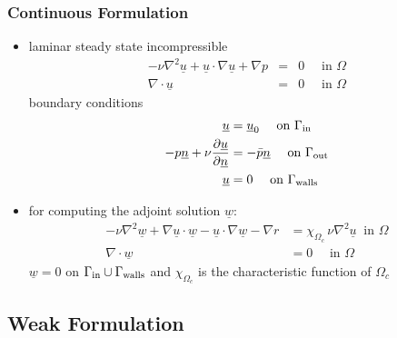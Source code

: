 \documentclass[10pt,t]{beamer}
\newcommand{\blue}[1]{{\color{blue}{#1}}}
\newcommand{\lblue}[1]{{\color{lblue}{#1}}}
\def \pder#1#2{\frac{\partial #1}{\partial #2}}
\newcommand{\ul}[1]{\underline{#1}}
\begin{document}
\begin{frame}
  \frametitle{Continuous Formulation}
  \begin{itemize}
  \item<1-> laminar steady state incompressible \blue{Navier-Stokes equations}
    \begin{eqnarray}
      -\nu \nabla^2 \ul{u} + \ul{u} \cdot \nabla \ul{u} + \nabla p & = & 0 \quad \mbox{ in }
      \Omega \label{eq-ns-1}\\
      \nabla \cdot \ul{u} & = & 0 \quad \mbox{ in } \Omega \label{eq-ns-2}
    \end{eqnarray}
    boundary conditions
    \begin{equation} \label{eq-ns-3}
      \begin{split}
        \ul{u} & = \ul{u}_0 \quad  \mbox{ on } \Gamma_{\rm in} \\
        -p \ul{n} + \nu \pder{\ul{u}}{\ul{n}} & = -\bar p \ul{n}
        \quad \mbox{ on } \Gamma_{\rm out} \\
        \ul{u} & = 0 \quad \mbox{ on } \Gamma_{\rm walls}
      \end{split}
    \end{equation}
  \item<2->
    \lblue{adjoint equations} for computing the adjoint solution $\ul{w}$:
    \begin{equation}\label{eq-ns-33}
      \begin{split}
        -\nu \nabla^2 \ul{w} + \nabla \ul{u} \cdot \ul{w} - \ul{u} \cdot \nabla
        \ul{w} - \nabla r & =
        \chi_{\Omega_c} \,\nu \nabla^2 \ul{u} \ \mbox{ in } \Omega \\
        \nabla \cdot \ul{w} & = 0 \quad \mbox{ in } \Omega
      \end{split}
    \end{equation}
    $\ul{w} = 0$ on $\Gamma_{\rm in} \cup \Gamma_{\rm walls}$ and
    $\chi_{\Omega_c}$ is the characteristic function of $\Omega_c$
  \end{itemize}
\end{frame}
\subsection{Weak Formulation}
\end{document}
